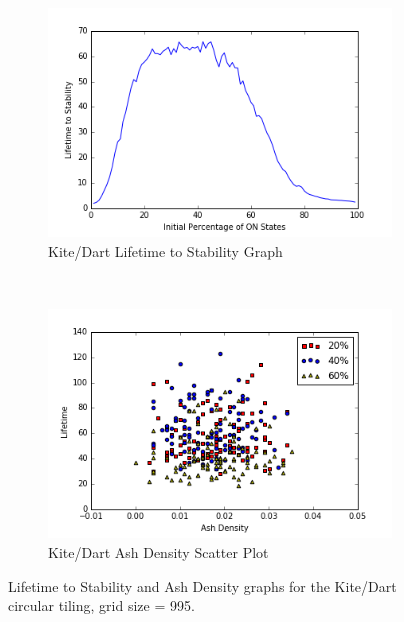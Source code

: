 \documentclass[a4paper,11pt,twoside]{report}
\begin{document}
\begin{figure}[htp]
\centering
\begin{subfigure}[t]{0.6\textwidth}
	\centering
	\includegraphics[width=\textwidth]{ch4_figs/ckd_lifetime}
	\caption{Kite/Dart Lifetime to Stability Graph}
\end{subfigure}
~
\begin{subfigure}[t]{0.6\textwidth}
	\centering
	\includegraphics[width=\textwidth]{ch4_figs/ckd_ash_density}
	\caption{Kite/Dart Ash Density Scatter Plot}
\end{subfigure}

\caption[Kite/Dart Lifetime and Ash Density Graphs]{
	Lifetime to Stability and Ash Density graphs for the Kite/Dart circular tiling, grid size = 995. 
}
\label{fig:ckd_lifetime_density}
\end{figure}
\end{document}
